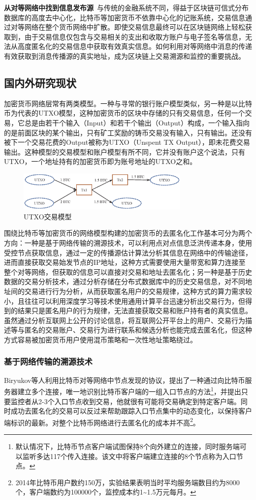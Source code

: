 \documentclass[supercite]{HustGraduPaper}
\newcommand{\xfig}[3]{
  \begin{figure}[htb]
    \centering
    #3
    \caption{#2}
    \label{fig:#1}
  \end{figure}
}
\theoremstyle{definition}
\begin{document}
\textbf{从对等网络中找到信息发布源}\ 与传统的金融系统不同，得益于区块链可信式分布数据库的高度去中心化，比特币等加密货币不依靠中心化的记账系统，交易信息通过对等网络在整个货币网络中扩散。即使交易信息最终可以在区块链网络上轻松获取到，由于交易信息仅包含与交易相关的支出和收取方账户与电子签名等信息，无法从高度匿名化的交易信息中获取有效真实信息。如何利用对等网络中消息的传递有效获取到消息传播源的真实地址，成为区块链上交易溯源和监控的重要挑战。

\subsection{国内外研究现状}
加密货币网络层常有两类模型\cite{wu2021analysis}。一种与寻常的银行账户模型类似，另一种是以比特币为代表的UTXO模型，这种加密货币的区块中存储的只有交易信息，任何一个交易，它总是由若干个输入（Input）和若干个输出（Output）构成，一个输入指向的是前面区块的某个输出，只有矿工奖励的铸币交易没有输入，只有输出。还没有被下一个交易花费的Output被称为UTXO（Unspent TX Output），即未花费交易输出。这种模型的交易模型和账户模型有所不同，它并没有账户这个说法，只有UTXO，一个地址持有的加密货币即为账号地址的UTXO之和。
\xfig{utxo}{UTXO交易模型}{
  \includegraphics[width=0.75\textwidth]{images/1.1-utxo.ps} 
}

围绕比特币等加密货币的网络模型构建的加密货币的去匿名化工作基本可分为两个方向：一种是基于网络传输的溯源技术，可以利用点对点信息泛洪传递本身，使用受控节点获取信息，通过一定的传播源估计算法分析其信息在网络中的传输途径，进而直接获取交易始发节点的IP地址，这种方式需要使用大量带宽和算力连接至整个对等网络，但获取的信息可以直接对交易和地址去匿名化；另一种是基于历史数据的交易分析技术，通过分析存储在分布式数据库中的历史交易信息，对不同地址间的交易进行行为分析，从而获取匿名用户的交易规律，这种方式的算力需求较小，且往往可以利用深度学习等技术使用通用计算平台迅速分析出交易行为，但得到的结果只是匿名用户的行为规律，无法直接获取交易和账户持有者的真实信息。虽然通过分析互联网上公开的讨论信息，将互联网公开平台上的用户、交易行为描述等与匿名的交易账户、交易行为进行联系和候选分析也能完成去匿名化，但这种方式容易被加密货币用户使用混币策略\cite{bonneau2014mixcoin}和一次性地址策略绕过。


\subsubsection{基于网络传输的溯源技术}
Biryukov\cite{biryukov2014deanonymisation}等人利用比特币对等网络中节点发现的协议，提出了一种通过向比特币服务器建立多个连接，唯一地识别比特币客户端的一组入口节点的方法\footnote{默认情况下，比特币节点客户端试图保持8个向外建立的连接，同时服务端可以监听多达117个传入连接。该文中将客户端建立连接的8个节点称为入口节点。}，并提出只要监控者从2-3个入口节点收到交易，他就很有可能将交易确定到特定客户端。同时成功去匿名化的交易可以反过来帮助跟踪入口节点集中的动态变化，以保持客户端标识的最新。对整个比特币网络进行去匿名化的成本并不高\footnote{2014年比特币用户数约150万，实验结果表明当时平均服务端数目约为8000个，客户端数约为100000个，监控成本约1\textasciitilde 1.5万元每月。}。
\end{document}

